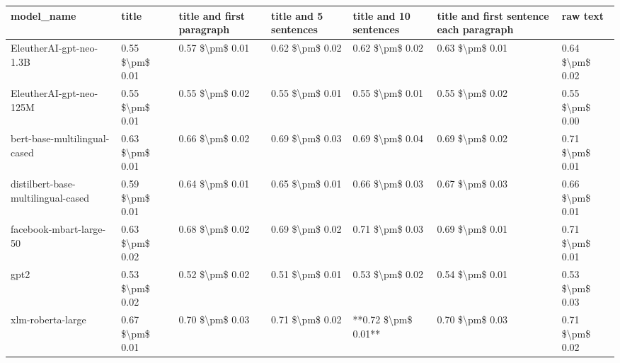 \begin{tabular}{lllllll}
\toprule
                        model\_name &           title & title and first paragraph & title and 5 sentences & title and 10 sentences & title and first sentence each paragraph &        raw text \\
\midrule
           EleutherAI-gpt-neo-1.3B & 0.55 \$\textbackslash pm\$ 0.01 &           0.57 \$\textbackslash pm\$ 0.01 &       0.62 \$\textbackslash pm\$ 0.02 &        0.62 \$\textbackslash pm\$ 0.02 &                         0.63 \$\textbackslash pm\$ 0.01 & 0.64 \$\textbackslash pm\$ 0.02 \\
           EleutherAI-gpt-neo-125M & 0.55 \$\textbackslash pm\$ 0.01 &           0.55 \$\textbackslash pm\$ 0.02 &       0.55 \$\textbackslash pm\$ 0.01 &        0.55 \$\textbackslash pm\$ 0.01 &                         0.55 \$\textbackslash pm\$ 0.02 & 0.55 \$\textbackslash pm\$ 0.00 \\
      bert-base-multilingual-cased & 0.63 \$\textbackslash pm\$ 0.01 &           0.66 \$\textbackslash pm\$ 0.02 &       0.69 \$\textbackslash pm\$ 0.03 &        0.69 \$\textbackslash pm\$ 0.04 &                         0.69 \$\textbackslash pm\$ 0.02 & 0.71 \$\textbackslash pm\$ 0.01 \\
distilbert-base-multilingual-cased & 0.59 \$\textbackslash pm\$ 0.01 &           0.64 \$\textbackslash pm\$ 0.01 &       0.65 \$\textbackslash pm\$ 0.01 &        0.66 \$\textbackslash pm\$ 0.03 &                         0.67 \$\textbackslash pm\$ 0.03 & 0.66 \$\textbackslash pm\$ 0.01 \\
           facebook-mbart-large-50 & 0.63 \$\textbackslash pm\$ 0.02 &           0.68 \$\textbackslash pm\$ 0.02 &       0.69 \$\textbackslash pm\$ 0.02 &        0.71 \$\textbackslash pm\$ 0.03 &                         0.69 \$\textbackslash pm\$ 0.01 & 0.71 \$\textbackslash pm\$ 0.01 \\
                              gpt2 & 0.53 \$\textbackslash pm\$ 0.02 &           0.52 \$\textbackslash pm\$ 0.02 &       0.51 \$\textbackslash pm\$ 0.01 &        0.53 \$\textbackslash pm\$ 0.02 &                         0.54 \$\textbackslash pm\$ 0.01 & 0.53 \$\textbackslash pm\$ 0.03 \\
                 xlm-roberta-large & 0.67 \$\textbackslash pm\$ 0.01 &           0.70 \$\textbackslash pm\$ 0.03 &       0.71 \$\textbackslash pm\$ 0.02 &    **0.72 \$\textbackslash pm\$ 0.01** &                         0.70 \$\textbackslash pm\$ 0.03 & 0.71 \$\textbackslash pm\$ 0.02 \\
\bottomrule
\end{tabular}
